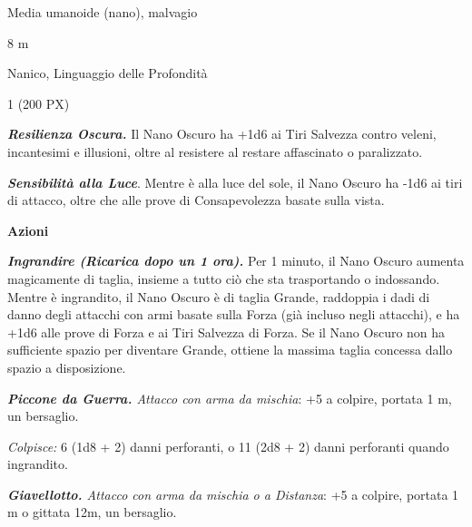 \begin{multicols}{2}
{
\begin{description}[noitemsep, topsep=0pt, parsep=0pt, partopsep=0pt, itemsep=1pt, leftmargin=2.35cm,  labelwidth=2.2cm, itemindent=0cm, listparindent=0pt] %
\setlength{\baselineskip}{10pt}
\item[\textbf{Taglia/Tipo}] Media umanoide (nano), malvagio
\item[\textbf{Caratt.}] 
\item[\textbf{Punti Ferita}] 
\item[\textbf{Movimento}] 8 m
\item[\textbf{Tiri Salvez.}] 
\item[\textbf{Sensi}] 
\item[\textbf{Linguaggi}] Nanico, Linguaggio delle Profondità
\item[\textbf{Sfida}] 1 (200 PX)
\end{description}
\smallskip

\emph{\textbf{Resilienza Oscura.}} Il Nano Oscuro ha +1d6 ai Tiri Salvezza contro veleni, incantesimi e illusioni, oltre al resistere al restare affascinato o paralizzato.

\emph{\textbf{Sensibilità alla Luce}}. Mentre è alla luce del sole, il Nano Oscuro ha -1d6 ai tiri di attacco, oltre che alle prove di Consapevolezza basate sulla vista.

\textbf{Azioni}

\emph{\textbf{Ingrandire (Ricarica dopo un 1 ora).}} Per 1 minuto, il Nano Oscuro aumenta magicamente di taglia, insieme a tutto ciò che sta trasportando o indossando. Mentre è ingrandito, il Nano Oscuro è di taglia Grande, raddoppia i dadi di danno degli attacchi con armi basate sulla Forza (già incluso negli attacchi), e ha +1d6 alle prove di Forza e ai Tiri Salvezza di Forza. Se il Nano Oscuro non ha sufficiente spazio per diventare Grande, ottiene la massima taglia concessa dallo spazio a disposizione.

\emph{\textbf{Piccone da Guerra.} Attacco con arma da mischia}: +5 a colpire, portata 1 m, un bersaglio.

\emph{Colpisce:} 6 (1d8 + 2) danni perforanti, o 11 (2d8 + 2) danni perforanti quando ingrandito.

\emph{\textbf{Giavellotto.} Attacco con arma da mischia o a Distanza}: +5 a colpire, portata 1 m o gittata 12m, un bersaglio.

}
\end{multicols}
